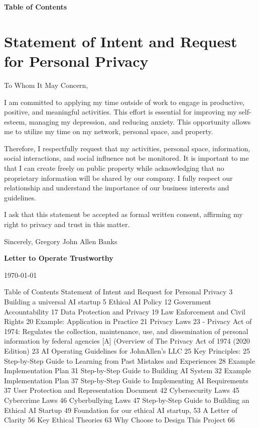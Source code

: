 \documentclass[12pt,letterpaper]{article}
\begin{document}
\thispagestyle{firstpage}  %

\begin{center}
\Large\textbf{Table of Contents}
\end{center}

\tableofcontents
\newpage

\section{Statement of Intent and Request for Personal Privacy}

\noindent To Whom It May Concern,

\noindent I am committed to applying my time outside of work to engage in productive, positive, and meaningful activities. This effort is essential for improving my self-esteem, managing my depression, and reducing anxiety. This opportunity allows me to utilize my time on my network, personal space, and property.

Therefore, I respectfully request that my activities, personal space, information, social interactions, and social influence not be monitored. It is important to me that I can create freely on public property while acknowledging that no proprietary information will be shared by our company. I fully respect our relationship and understand the importance of our business interests and guidelines.

I ask that this statement be accepted as formal written consent, affirming my right to privacy and trust in this matter.

Sincerely,
Gregory John Allen Banks

\vspace{1em}

\begin{center}
    \Large\textbf{Letter to Operate Trustworthy}
\end{center}

\vspace{1em}

\today

\vspace{1em}

Table of Contents
Statement of Intent and Request for Personal Privacy	3
Building a universal AI startup	5
Ethical AI Policy	12
Government Accountability	17
Data Protection and Privacy	19
Law Enforcement and Civil Rights	20
Example: Application in Practice	21
Privacy Laws	23
- Privacy Act of 1974: Regulates the collection, maintenance, use, and dissemination of personal information by federal agencies [A] (Overview of The Privacy Act of 1974 (2020 Edition)	23
AI Operating Guidelines for JohnAllen’s LLC	25
Key Principles:	25
Step-by-Step Guide to Learning from Past Mistakes and Experiences	28
Example Implementation Plan	31
Step-by-Step Guide to Building AI System	32
Example Implementation Plan	37
Step-by-Step Guide to Implementing AI Requirements	37
User Protection and Representation Document	42
Cybersecurity Laws	45
Cybercrime Laws	46
Cyberbullying Laws	47
Step-by-Step Guide to Building an Ethical AI Startup	49
Foundation for our ethical AI startup,	53
A Letter of Clarity	56
Key Ethical Theories	63
Why Choose to Design This Project	66
\end{document}
